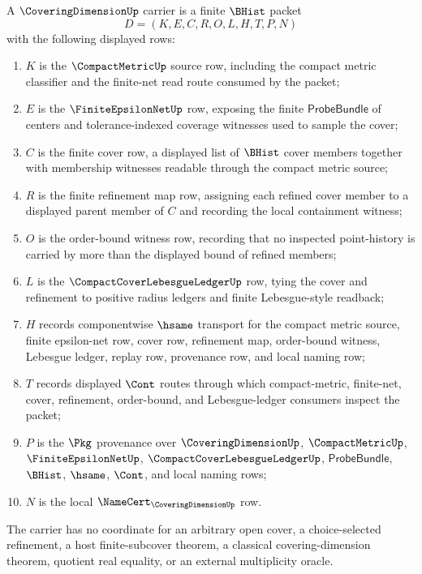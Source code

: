 \begin{definition}
\label{def:covering-dimension-carrier}
A $\CoveringDimensionUp$ carrier is a finite $\BHist$ packet
$$
D=(K,E,C,R,O,L,H,T,P,N)
$$
with the following displayed rows:
\begin{enumerate}
\item $K$ is the $\CompactMetricUp$ source row, including the compact metric classifier and the finite-net read route consumed by the packet;
\item $E$ is the $\FiniteEpsilonNetUp$ row, exposing the finite $\mathsf{ProbeBundle}$ of centers and tolerance-indexed coverage witnesses used to sample the cover;
\item $C$ is the finite cover row, a displayed list of $\BHist$ cover members together with membership witnesses readable through the compact metric source;
\item $R$ is the finite refinement map row, assigning each refined cover member to a displayed parent member of $C$ and recording the local containment witness;
\item $O$ is the order-bound witness row, recording that no inspected point-history is carried by more than the displayed bound of refined members;
\item $L$ is the $\CompactCoverLebesgueLedgerUp$ row, tying the cover and refinement to positive radius ledgers and finite Lebesgue-style readback;
\item $H$ records componentwise $\hsame$ transport for the compact metric source, finite epsilon-net row, cover row, refinement map, order-bound witness, Lebesgue ledger, replay row, provenance row, and local naming row;
\item $T$ records displayed $\Cont$ routes through which compact-metric, finite-net, cover, refinement, order-bound, and Lebesgue-ledger consumers inspect the packet;
\item $P$ is the $\Pkg$ provenance over $\CoveringDimensionUp$, $\CompactMetricUp$, $\FiniteEpsilonNetUp$, $\CompactCoverLebesgueLedgerUp$, $\mathsf{ProbeBundle}$, $\BHist$, $\hsame$, $\Cont$, and local naming rows;
\item $N$ is the local $\NameCert_{\CoveringDimensionUp}$ row.
\end{enumerate}
The carrier has no coordinate for an arbitrary open cover, a choice-selected refinement, a host finite-subcover theorem, a classical covering-dimension theorem, quotient real equality, or an external multiplicity oracle.
\end{definition}

